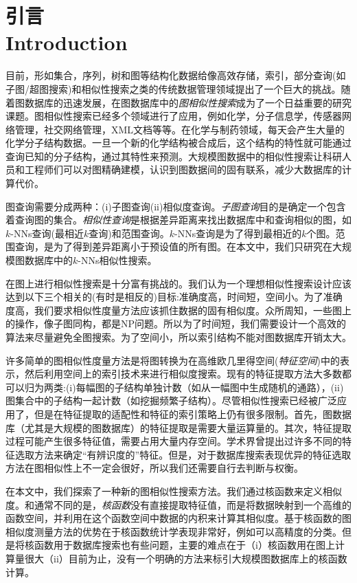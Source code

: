 \documentclass{article}
\begin{document}
\else

\fi
\chapter{引言 \\ Introduction}
目前，形如集合，序列，树和图等结构化数据给像高效存储，索引，部分查询(如子图/超图搜索)和相似性搜索之类的传统数据管理领域提出了一个巨大的挑战。随着图数据库的迅速发展，在图数据库中的\emph{图相似性搜索}成为了一个日益重要的研究课题。图相似性搜索已经多个领域进行了应用，例如化学，分子信息学，传感器网络管理，社交网络管理，XML文档等等。在化学与制药领域，每天会产生大量的化学分子结构数据。一旦一个新的化学结构被合成后，这个结构的特性就可能通过查询已知的分子结构，通过其特性来预测。大规模图数据中的相似性搜索让科研人员和工程师们可以对图精确建模，认识到图数据间的固有联系，减少大数据库的计算代价。

图查询需要分成两种：(i)子图查询(ii)相似度查询。\emph{子图查询}目的是确定一个包含着查询图的集合。\emph{相似性查询}是根据差异距离来找出数据库中和查询相似的图，如$k$-NNs查询(最相近$k$查询)和范围查询。$k$-NNs查询是为了得到最相近的$k$个图。范围查询，是为了得到差异距离小于预设值的所有图。在本文中，我们只研究在大规模图数据库中的$k$-NNs相似性搜索。

在图上进行相似性搜索是十分富有挑战的。我们认为一个理想相似性搜索设计应该达到以下三个相关的(有时是相反的)目标:准确度高，时间短，空间小。为了准确度高，我们要求相似性度量方法应该抓住数据的固有相似度。众所周知，一些图上的操作，像子图同构，都是NP问题。所以为了时间短，我们需要设计一个高效的算法来尽量避免全图搜索。为了空间小，所以索引结构不能对图数据库开销太大。

许多简单的图相似性度量方法是将图转换为在高维欧几里得空间(\emph{特征空间})中的表示，然后利用空间上的索引技术来进行相似度搜索。现有的特征提取方法大多数都可以归为两类:(i)每幅图的子结构单独计数（如从一幅图中生成随机的通路），(ii)图集合中的子结构一起计数（如挖掘频繁子结构）。尽管相似性搜索已经被广泛应用了，但是在特征提取的适配性和特征的索引策略上仍有很多限制。首先，图数据库（尤其是大规模的图数据库）的特征提取是需要大量运算量的。其次，特征提取过程可能产生很多特征值，需要占用大量内存空间。学术界曾提出过许多不同的特征选取方法来确定“有辨识度的”特征。但是，对于数据库搜索表现优异的特征选取方法在图相似性上不一定会很好，所以我们还需要自行去判断与权衡。

在本文中，我们探索了一种新的图相似性搜索方法。我们通过核函数来定义相似度。和通常不同的是，\emph{核函数}没有直接提取特征值，而是将数据映射到一个高维的函数空间，并利用在这个函数空间中数据的内积来计算其相似度。基于核函数的图相似度测量方法的优势在于核函数统计学表现非常好，例如可以高精度的分类。但是将核函数用于数据库搜索也有些问题，主要的难点在于（i）核函数用在图上计算量很大（ii）目前为止，没有一个明确的方法来标引大规模图数据库上的核函数计算。
\end{document}
